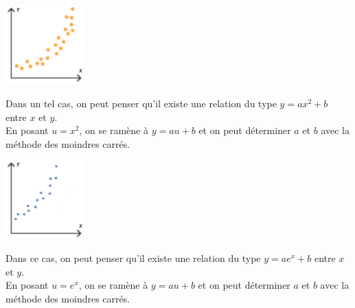 \documentclass[a4paper,11pt,cours]{nsi} %
\begin{document}
\begin{multicols}{2}
    \begin{center}
        \includegraphics[width=3cm]{Figure2.png}
    \end{center}
    Dans un tel cas, on peut penser qu'il existe une relation du type $y=ax^2+b$ entre $x$ et $y$.\\
    En posant $u=x^2$, on se ramène à $y=au+b$ et on peut déterminer $a$ et $b$ avec la méthode des moindres carrés.\\

    \begin{center}
        \includegraphics[width=3cm]{Figure4.png}
    \end{center}
    Dans ce cas, on peut penser qu'il existe une relation du type $y=ae^x+b$ entre $x$ et $y$.\\
    En posant $u=e^x$, on se ramène à $y=au+b$ et on peut déterminer $a$ et $b$ avec la méthode des moindres carrés.\\
\end{multicols}
\end{document}

